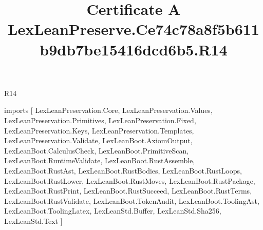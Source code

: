 \begin{lexlean}{R14}
\title{Certificate A LexLeanPreserve.Ce74c78a8f5b611b9db7be15416dcd6b5.R14}
\begin{coremodule}
imports [
  LexLeanPreservation.Core,
  LexLeanPreservation.Values,
  LexLeanPreservation.Primitives,
  LexLeanPreservation.Fixed,
  LexLeanPreservation.Keys,
  LexLeanPreservation.Templates,
  LexLeanPreservation.Validate,
  LexLeanBoot.AxiomOutput,
  LexLeanBoot.CalculusCheck,
  LexLeanBoot.PrimitiveScan,
  LexLeanBoot.RuntimeValidate,
  LexLeanBoot.RustAssemble,
  LexLeanBoot.RustAst,
  LexLeanBoot.RustBodies,
  LexLeanBoot.RustLoops,
  LexLeanBoot.RustLower,
  LexLeanBoot.RustMoves,
  LexLeanBoot.RustPackage,
  LexLeanBoot.RustPrint,
  LexLeanBoot.RustSucceed,
  LexLeanBoot.RustTerms,
  LexLeanBoot.RustValidate,
  LexLeanBoot.TokenAudit,
  LexLeanBoot.ToolingAst,
  LexLeanBoot.ToolingLatex,
  LexLeanStd.Buffer,
  LexLeanStd.Sha256,
  LexLeanStd.Text
]


\end{coremodule}
\end{lexlean}

